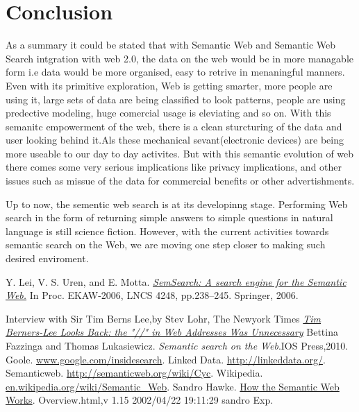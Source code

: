 \documentclass[12pt,a4]{article}
\begin{document}
\section{Conclusion}
As a summary it could be stated that with Semantic Web and Semantic Web Search intgration with web 2.0, the data on the web would be in more managable form i.e  data would be more organised, easy to  retrive in menaningful manners. Even with its primitive exploration, Web is getting smarter, more people are using it, large sets of data are being classified to look patterns, people are using predective modeling, huge comercial usage is eleviating and so on. With this semanitc empowerment of the web, there is a clean sturcturing of the data and user looking behind it.Als these mechanical sevant(electronic devices) are being more useable to our day to day activites. But with this semantic evolution of web there comes some very serious implications like privacy implications, and other issues such as missue of the data for commercial benefits or other advertishments.

Up to now, the sementic web search is at its developinng stage. Performing Web search in the form of returning simple answers to simple questions in natural language is still science fiction. However, with the current activities towards semantic search on the Web, we are moving one step closer to making such desired enviroment.

\begin{thebibliography}{9}
 Y. Lei, V. S. Uren, and E. Motta. \href{http://citeseerx.ist.psu.edu/viewdoc/download?doi=10.1.1.98.3235\&rep=rep1\&type=pdf}{
    \textit{ SemSearch: A search engine for the Semantic Web.}} In Proc. EKAW-2006, LNCS 4248, pp.238--245. Springer, 2006.

 Interview with Sir Tim Berns Lee,by Stev Lohr, The Newyork Times \href{http://blip.tv/beettv/tim-berners-lee-looks-back-the-in-web-addresses-was-unnecessary-2727797} {\textit{
Tim Berners-Lee Looks Back: the "//" in Web Addresses Was Unnecessary}}
 Bettina Fazzinga and Thomas Lukasiewicz. \textit{Semantic search on the Web}.IOS Press,2010.
 Goole. \url{www.google.com/insidesearch}.
  Linked Data. \url{http://linkeddata.org/}.
Semanticweb. \url{http://semanticweb.org/wiki/Cyc}.
Wikipedia. \url{ en.wikipedia.org/wiki/Semantic_Web}.
 Sandro Hawke. \href{http://www.w3.org/2002/03/semweb/}{How the Semantic Web Works}. Overview.html,v 1.15 2002/04/22 19:11:29 sandro Exp.

\end{thebibliography}
\end{document}
